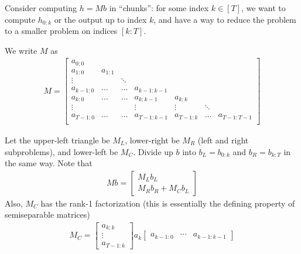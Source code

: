 \documentclass{article}
\begin{document}
Consider computing $h = Mb$ in ``chunks'': for some index $k \in [T]$, we want to compute $h_{0:k}$ or the output up to index $k$, and have a way to reduce the problem to a smaller problem on indices $[k:T]$.

We write $M$ as
\begin{align*}
  M =
  \begin{bmatrix}
    a_{0:0} & \\
    a_{1:0} & a_{1:1} \\
    \vdots & & \ddots \\
    a_{k-1:0} & \dots & \dots & a_{k-1:k-1} \\
    a_{k:0} & \dots & \dots & a_{k:k-1} & a_{k:k} \\
    \vdots & & & \vdots & \vdots & \ddots \\
    a_{T-1:0} & \dots & \dots & a_{T-1:k-1} & a_{T-1:k} & \dots & a_{T-1:T-1} \\
  \end{bmatrix}
\end{align*}

Let the upper-left triangle be $M_L$, lower-right be $M_R$ (left and right subproblems), and lower-left be $M_C$.
Divide up $b$ into $b_L = b_{0:k}$ and $b_R = b_{k:T}$ in the same way.
Note that
\begin{align*}
  Mb = \begin{bmatrix} M_L b_L \\ M_R b_R + M_C b_L \end{bmatrix}
\end{align*}
Also, $M_C$ has the rank-1 factorization (this is essentially the defining property of semiseparable matrices)
\begin{align*}
  M_C =
  \begin{bmatrix} a_{k:k} \\ \vdots \\ a_{T-1:k} \end{bmatrix}
  a_k
  \begin{bmatrix} a_{k-1:0} & \cdots & a_{k-1:k-1} \end{bmatrix}
\end{align*}
\end{document}
